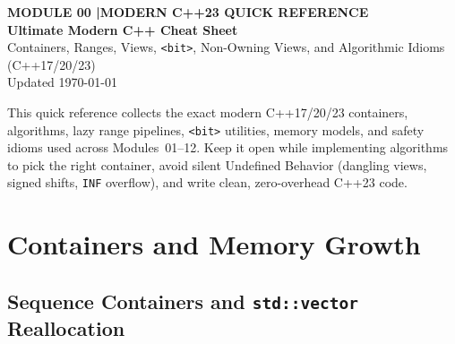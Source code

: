 \documentclass[11pt,a4paper]{article}
\newcommand{\sectionbreak}{}
\begin{document}
\thispagestyle{plain}
\begin{tcolorbox}[
    enhanced,
    colback=primaryblue!6, colframe=primaryblue!20,
    borderline west={5pt}{0pt}{primaryblue},
    arc=4pt, boxrule=0.6pt,
    left=14pt, right=14pt, top=7pt, bottom=7pt,
    before skip=0pt, after skip=5pt
]
    {\footnotesize\bfseries\color{accentteal}MODULE 00 \quad|\quad MODERN C++23 QUICK REFERENCE}\\[3pt]
    {\Huge\bfseries\color{primaryblue}Ultimate Modern C++ Cheat Sheet}\\[3pt]
    {\large\color{codegray}Containers, Ranges, Views, \texttt{<bit>}, Non-Owning Views, and Algorithmic Idioms (C++17/20/23)}\\[4pt]
    {\footnotesize\color{codegray}Updated \today}
\end{tcolorbox}

\begin{overviewbox}
This quick reference collects the exact modern C++17/20/23 containers, algorithms, lazy range pipelines, \texttt{<bit>} utilities, memory models, and safety idioms used across Modules~01--12. Keep it open while implementing algorithms to pick the right container, avoid silent Undefined Behavior (dangling views, signed shifts, \texttt{INF} overflow), and write clean, zero-overhead C++23 code.
\end{overviewbox}

\vspace{-5pt}
{\setlength{\parskip}{0pt}\footnotesize\tableofcontents}

\renewcommand{\sectionbreak}{\clearpage}

\section{Containers and Memory Growth}

\subsection{Sequence Containers and \texttt{std::vector} Reallocation}
\end{document}
